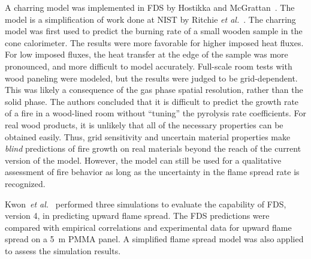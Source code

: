 A   charring  model   was   implemented  in   FDS   by  Hostikka   and McGrattan~\cite{Hostikka:2}.  The model  is a  simplification  of work done at
NIST by Ritchie  {\em et al.}~\cite{Ritchie:1}.  The charring model was  first used to  predict the burning  rate of a  small wooden sample in the
cone calorimeter.  The results were  more favorable for higher imposed heat fluxes. For  low imposed fluxes, the heat transfer at the edge  of the
sample was more pronounced,  and more difficult to model  accurately.   Full-scale room  tests  with  wood paneling  were modeled, but  the results
were  judged to be grid-dependent.  This was likely a consequence of the  gas phase spatial resolution, rather than the solid phase. The authors
concluded that it is difficult to predict the growth rate of a fire  in a wood-lined room without ``tuning'' the pyrolysis rate  coefficients. For
real  wood products, it  is unlikely that all  of the  necessary properties can  be obtained  easily. Thus, grid sensitivity  and uncertain  material
properties make  {\em blind} predictions of fire  growth on real materials beyond  the reach of the current version of the model. However, the model
can still be used for a qualitative assessment  of fire behavior as long  as the uncertainty in the flame spread rate is recognized.

Kwon~{\em et al.}~\cite{Kwon:Fire_Technology_2007} performed three simulations to evaluate the capability of
FDS, version 4, in predicting upward flame spread. The FDS predictions were
compared with empirical correlations and experimental data for upward flame spread
on a 5~m PMMA panel. A simplified flame spread model was also applied to assess the simulation results.


